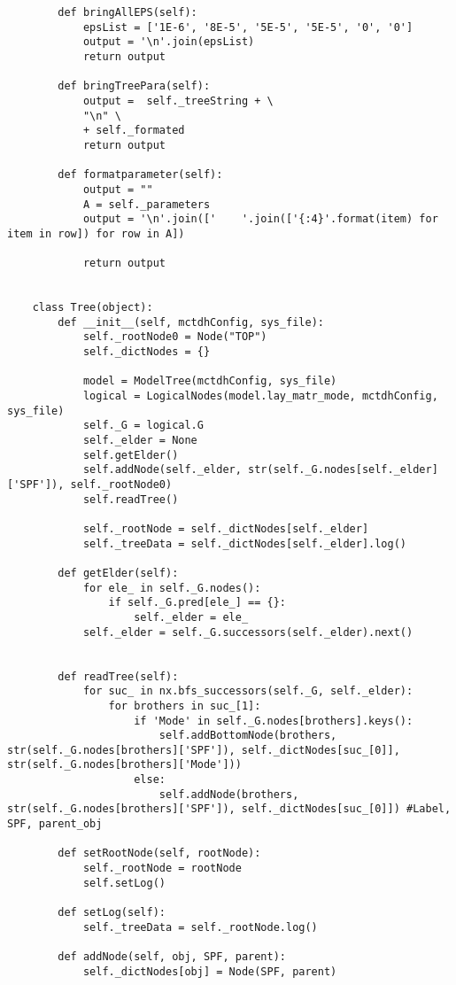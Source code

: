 \begin{verbatim}
        def bringAllEPS(self):
            epsList = ['1E-6', '8E-5', '5E-5', '5E-5', '0', '0']
            output = '\n'.join(epsList)
            return output
    
        def bringTreePara(self):
            output =  self._treeString + \
            "\n" \
            + self._formated
            return output
    
        def formatparameter(self):
            output = ""
            A = self._parameters        
            output = '\n'.join(['    '.join(['{:4}'.format(item) for item in row]) for row in A])
    
            return output
    
    
    class Tree(object):
        def __init__(self, mctdhConfig, sys_file):
            self._rootNode0 = Node("TOP")
            self._dictNodes = {}
    
            model = ModelTree(mctdhConfig, sys_file)
            logical = LogicalNodes(model.lay_matr_mode, mctdhConfig, sys_file)
            self._G = logical.G
            self._elder = None
            self.getElder()
            self.addNode(self._elder, str(self._G.nodes[self._elder]['SPF']), self._rootNode0)
            self.readTree()
    
            self._rootNode = self._dictNodes[self._elder]
            self._treeData = self._dictNodes[self._elder].log()
    
        def getElder(self):
            for ele_ in self._G.nodes():
                if self._G.pred[ele_] == {}:
                    self._elder = ele_
            self._elder = self._G.successors(self._elder).next()
    
    
        def readTree(self):
            for suc_ in nx.bfs_successors(self._G, self._elder):
                for brothers in suc_[1]:
                    if 'Mode' in self._G.nodes[brothers].keys():
                        self.addBottomNode(brothers, str(self._G.nodes[brothers]['SPF']), self._dictNodes[suc_[0]], str(self._G.nodes[brothers]['Mode']))
                    else:
                        self.addNode(brothers, str(self._G.nodes[brothers]['SPF']), self._dictNodes[suc_[0]]) #Label, SPF, parent_obj
    
        def setRootNode(self, rootNode):
            self._rootNode = rootNode
            self.setLog()
    
        def setLog(self):
            self._treeData = self._rootNode.log()
    
        def addNode(self, obj, SPF, parent):
            self._dictNodes[obj] = Node(SPF, parent)
    

\end{verbatim}
